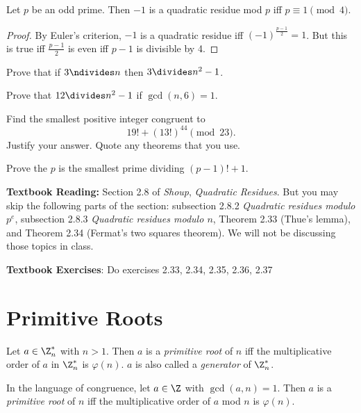 \documentclass[oneside,12pt]{amsart}
\begin{document}
\begin{theorem}
\label{WhenIsMinusOneASquare}
Let $p$ be an odd prime. Then $-1$ is a quadratic residue mod $p$ iff $p\equiv 1 \pmod 4$.
\end{theorem}
\begin{proof}
By Euler's criterion, $-1$ is a quadratic residue iff $(-1)^{\frac{p-1}{2}}=1$. But this is true
iff $\frac{p-1}{2}$ is even iff $p-1$ is divisible by 4.
\end{proof}

\bigskip

\begin{homework} 
Prove that if $3\ndivides n$ then $3\divides n^2 -1$.
\end{homework}

\begin{homework}
Prove that $12 \divides n^2 -1$ if $\gcd(n,6) = 1$.
\end{homework}

\begin{homework}
Find the smallest positive integer congruent to
$$19! + (13!)^{44} \pmod{23}.$$
Justify your answer. Quote any theorems that you use.
\end{homework}

\begin{homework}
Prove the $p$ is the smallest prime dividing $(p-1)! + 1$.
\end{homework}

\bigskip

\textbf{Textbook Reading:} Section 2.8 of \emph{Shoup}, \emph{Quadratic Residues}. But you may skip the following parts of the section:
subsection 2.8.2 \emph{Quadratic residues modulo $p^e$}, subsection 2.8.3 \emph{Quadratic residues modulo $n$}, Theorem 2.33 (Thue's lemma),
and Theorem 2.34 (Fermat's two squares theorem). We will not be discussing those topics in class.

\textbf{Textbook Exercises}: Do exercises 2.33, 2.34, 2.35, 2.36, 2.37

\newpage

\section{Primitive Roots}

\begin{definition}
Let $a\in\Z_n^*$ with $n>1$. Then $a$ is a \emph{primitive root} of $n$ iff the multiplicative order of $a$ in $\Z^*_n$ is $\varphi(n)$.
$a$ is also called a \emph{generator} of $\Z^*_n$.

In the language of congruence, let $a\in\Z$ with $\gcd(a,n)=1$. Then $a$ is a \emph{primitive root} of $n$ iff the multiplicative order of
$a$ mod $n$ is $\varphi(n)$.
\end{definition}
\end{document}
